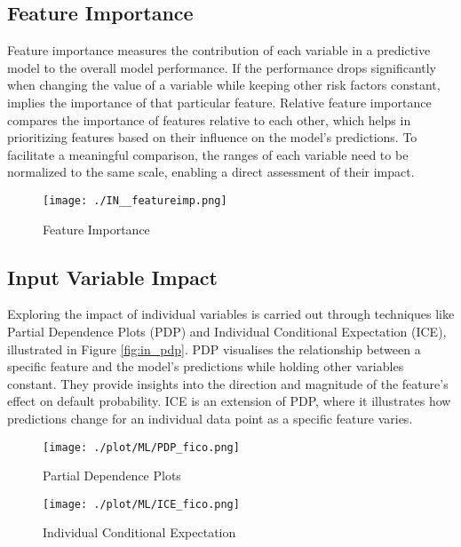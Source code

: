 \subsection{Feature Importance}
Feature importance measures the contribution of each variable in a predictive model to the overall model performance. If the performance drops significantly when changing the value of a variable while keeping other risk factors constant, implies the importance of that particular feature. Relative feature importance compares the importance of features relative to each other, which helps in prioritizing features based on their influence on the model's predictions. To facilitate a meaningful comparison, the ranges of each variable need to be normalized to the same scale, enabling a direct assessment of their impact. \cite[p.~63]{Roberts2022}

\begin{figure}[H]
	\centering
	\texttt{[image: ./IN\_\_featureimp.png]}
    \caption{Feature Importance}
    \label{fig:in_featureimp}
\end{figure}

\subsection{Input Variable Impact}
Exploring the impact of individual variables is carried out through techniques like Partial Dependence Plots (PDP) and Individual Conditional Expectation (ICE), illustrated in Figure \ref{fig:in_pdp}. PDP visualises the relationship between a specific feature and the model's predictions while holding other variables constant. They provide insights into the direction and magnitude of the feature's effect on default probability. ICE is an extension of PDP, where it illustrates how predictions change for an individual data point as a specific feature varies. \cite[p.~63]{Roberts2022}

\begin{figure}[H]
\begin{minipage}{.5\textwidth}
	\centering
	\texttt{[image: ./plot/ML/PDP\_fico.png]}
    \caption{Partial Dependence Plots}
    \label{fig:in_pdp}
\end{minipage}%
\begin{minipage}{.5\textwidth}
	\centering
	\texttt{[image: ./plot/ML/ICE\_fico.png]}
    \caption{Individual Conditional Expectation}
    \label{fig:in_ice}
\end{minipage}
\end{figure}

